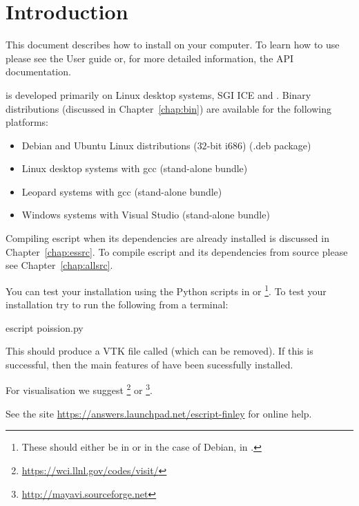 

%
%
%

\chapter{Introduction}
This document describes how to install \esfinley on your computer.
To learn how to use \esfinley please see the User guide or, for
more detailed information, the API documentation.

\esfinley is developed primarily on Linux desktop systems, SGI ICE and \macosx.
Binary distributions (discussed in Chapter~\ref{chap:bin}) are available for the following platforms:
\begin{itemize}
\item Debian and Ubuntu Linux distributions ($32$-bit i686) (.deb package)
\item Linux desktop systems with gcc (stand-alone bundle)
\item \macosx Leopard systems with gcc (stand-alone bundle)
\item Windows systems with Visual Studio (stand-alone bundle) 
\end{itemize}

Compiling escript when its dependencies are already installed is discussed in Chapter~\ref{chap:essrc}.
To compile escript and its dependencies from source please see Chapter~\ref{chap:allsrc}.

You can test your installation using the Python scripts in  or 
\footnote{These should either be in  or in the case of Debian, in .}.
To test your installation try to run the following from a terminal:
\begin{shellCode}
 escript poission.py
\end{shellCode}
This should produce a VTK file called  (which can be removed).
If this is successful, then the main features of \escript have been sucessfully installed.

For visualisation we suggest \footnote{\url{https://wci.llnl.gov/codes/visit/}} or \footnote{\url{http://mayavi.sourceforge.net}}.

See the site \url{https://answers.launchpad.net/escript-finley} for online help.
